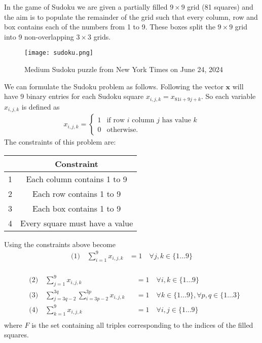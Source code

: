 \documentclass{article}
\begin{document}
In the game of Sudoku we are given a partially filled \(9 \times 9\) grid (81 squares) and the aim is to populate the remainder of the grid such that every column, row and box contains each of the numbers from 1 to 9. These boxes split the \(9 \times 9\) grid into 9 non-overlapping \(3 \times 3\) grids.

\begin{figure}[H]
    \centering
    \texttt{[image: sudoku.png]}
    \caption{Medium Sudoku puzzle from New York Times on June 24, 2024}
    \label{fig:Sudoku 1}
\end{figure}

\noindent We can formulate the Sudoku problem as follows. Following \cite[p.~1]{mücke2024sudoku} the vector \(\mathbf{x}\) will have 9 binary entries for each Sudoku square \(x_{i,j,k} = x_{81i + 9j + k}\). So each variable \(x_{i,j,k}\) is defined as
\begin{align*}
    x_{i,j,k} = \begin{cases}
        1 & \text{if row \(i\) column \(j\) has value \(k\)} \\
        0 & \text{otherwise.}
    \end{cases}
\end{align*}
The constraints of this problem are:
\begin{center}
\begin{tabular}{ |c|c| } 
 \hline
   & Constraint\\ 
 \hline
 1 & Each column contains 1 to 9\\ 
 2 & Each row contains 1 to 9\\
 3 & Each box contains 1 to 9\\
 4 & Every square must have a value\\
 \hline
\end{tabular}
\end{center}

\noindent Using \cite[p.~326]{ILPsudoku} the constraints above become
\begin{equation*}
\begin{aligned} 
\text{(1)} \quad \sum_{i=1}^9 x_{i,j,k} &= 1\quad \forall j,k \in \{1 \dots 9\} \\
\end{aligned}
\end{equation*}


\begin{equation*}
\begin{aligned} 
&\text{(2)} \quad \sum_{j=1}^9 x_{i,j,k} &&= 1\quad \forall i,k \in \{1 \dots 9\} \\
&\text{(3)} \quad \sum_{j=3q-2}^{3q} \sum_{i=3p-2}^{3p} x_{i,j,k} &&= 1\quad \forall k \in \{1 \dots 9\}, \forall p,q \in \{1 \dots 3\}\\
&\text{(4)} \quad \sum_{k=1}^9 x_{i,j,k} &&= 1\quad \forall i,j \in \{1 \dots 9\} \\
\end{aligned}
\end{equation*}
where \(F\) is the set containing all triples corresponding to the indices of the filled squares. \\
\end{document}
